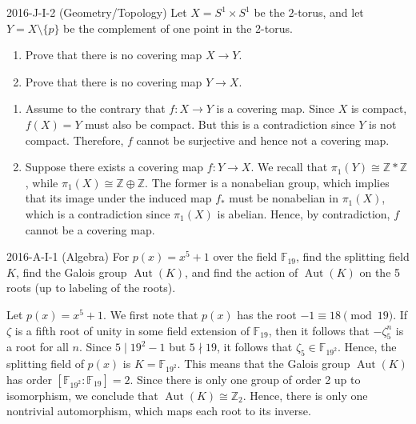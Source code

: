 \documentclass{article}
\begin{document}
\begin{prb}{2016-J-I-2 (Geometry/Topology)}
	Let $X = S^{1} \times S^{1}$ be the $2$-torus, and let $Y = X \setminus \{p\}$ be the complement of one point in the 2-torus. \vspace{-0.35cm}
		\begin{enumerate}[itemsep =-2pt,label = (\alph{*})]
			\item Prove that there is no covering map $X \to Y$. 
			\item Prove that there is no covering map $Y \to X$. 
		\end{enumerate}
\end{prb}
\begin{solutions}
	\vspace{-0.35cm}
	\begin{enumerate}[itemsep =-2pt,label = (\alph{*})]
		\item Assume to the contrary that $f: X \to Y$ is a covering map. Since $X$ is compact, $f(X) = Y$ must also be compact. But this is a contradiction since $Y$ is not compact. Therefore, $f$ cannot be surjective and hence not a covering map. 
		\item Suppose there exists a covering map $f: Y \to X$. We recall that $\pi_{1}(Y) \cong \mathbb{Z} \ast \mathbb{Z}$, while $\pi_{1}(X) \cong \mathbb{Z} \oplus \mathbb{Z}$. The former is a nonabelian group, which implies that its image under the induced map $f_{\ast}$ must be nonabelian in $\pi_{1}(X)$, which is a contradiction since $\pi_{1}(X)$ is abelian. Hence, by contradiction, $f$ cannot be a covering map. 
	\end{enumerate}
\end{solutions}

\begin{prb}{2016-A-I-1 (Algebra)}
	For $p(x)= x^{5} + 1$ over the field $\mathbb{F}_{19}$, find the splitting field $K$, find the Galois group $\operatorname{Aut}(K)$, and find the action of $\operatorname{Aut}(K)$ on the 5 roots (up to labeling of the roots). 
\end{prb}
\begin{solutions}
	Let $p(x) = x^{5} + 1$. We first note that $p(x)$ has the root $-1 \equiv 18 \pmod{19}$. If $\zeta$ is a fifth root of unity in some field extension of $\mathbb{F}_{19}$, then it follows that $-\zeta_{5}^{n}$ is a root for all $n$. Since $5 \mid 19^{2} - 1$ but $5 \nmid 19$, it follows that $\zeta_{5} \in \mathbb{F}_{19^{2}}$. Hence, the splitting field of $p(x)$ is $K = \mathbb{F}_{19^{2}}$. This means that the Galois group $\operatorname{Aut}(K)$ has order $[\mathbb{F}_{19^{2}}: \mathbb{F}_{19}] = 2$. Since there is only one group of order 2 up to isomorphism, we conclude that $\operatorname{Aut}(K) \cong \mathbb{Z}_{2}$. Hence, there is only one nontrivial automorphism, which maps each root to its inverse. 
\end{solutions}
\end{document}
